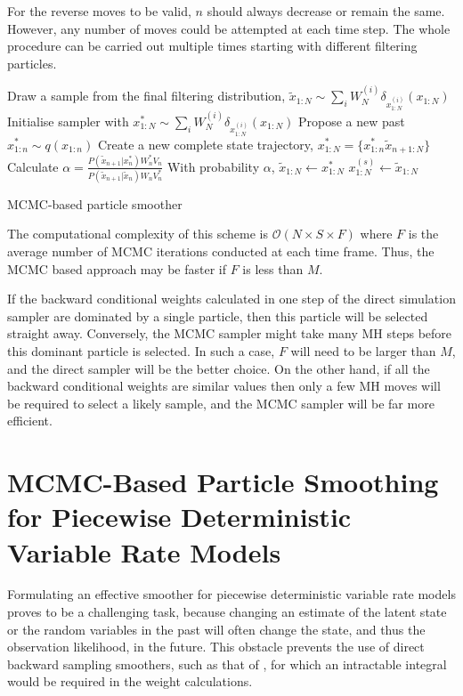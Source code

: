 \documentclass[a4paper,10pt]{article}
\begin{document}
For the reverse moves to be valid, $n$ should always decrease or remain the same. However, any number of moves could be attempted at each time step. The whole procedure can be carried out multiple times starting with different filtering particles.

\begin{algorithm}
 \begin{algorithmic}
  \STATE Draw a sample from the final filtering distribution, $\tilde{x}_{1:N} \sim \sum_{i} W_N^{(i)} \delta_{x_{1:N}^{(i)}}(x_{1:N})$
    \STATE Initialise sampler with $x^*_{1:N} \sim \sum_{i} W_N^{(i)} \delta_{x_{1:N}^{(i)}}(x_{1:N})$
	\STATE Propose a new past $x^*_{1:n} \sim q(x_{1:n})$
	\STATE Create a new complete state trajectory, $x^*_{1:N} = \{ x_{1:n}^* \tilde{x}_{n+1:N} \}$
	\STATE Calculate $\alpha = \frac{ P(\tilde{x}_{n+1}|x^*_n) W^*_n V_n } { P(\tilde{x}_{n+1}|\tilde{x}_n) W_n V^*_n }$
	\STATE With probability $\alpha$, $\tilde{x}_{1:N} \gets x^*_{1:N}$
      \ENDFOR
    \ENDFOR
    \STATE $x_{1:N}^{(s)} \gets \tilde{x}_{1:N}$
  \ENDFOR
 \end{algorithmic}
\label{alg:MCMC_smoother}
\caption{MCMC-based particle smoother}
\end{algorithm}

The computational complexity of this scheme is $\mathcal{O}(N \times S \times F)$ where $F$ is the average number of MCMC iterations conducted at each time frame. Thus, the MCMC based approach may be faster if $F$ is less than $M$.

If the backward conditional weights calculated in one step of the direct simulation sampler are dominated by a single particle, then this particle will be selected straight away. Conversely, the MCMC sampler might take many MH steps before this dominant particle is selected. In such a case, $F$ will need to be larger than $M$, and the direct sampler will be the better choice. On the other hand, if all the backward conditional weights are similar values then only a few MH moves will be required to select a likely sample, and the MCMC sampler will be far more efficient.



\section{MCMC-Based Particle Smoothing for Piecewise Deterministic Variable Rate Models}
Formulating an effective smoother for piecewise deterministic variable rate models proves to be a challenging task, because changing an estimate of the latent state or the random variables in the past will often change the state, and thus the observation likelihood, in the future. This obstacle prevents the use of direct backward sampling smoothers, such as that of \cite{Godsill2004}, for which an intractable integral would be required in the weight calculations.
\end{document}
